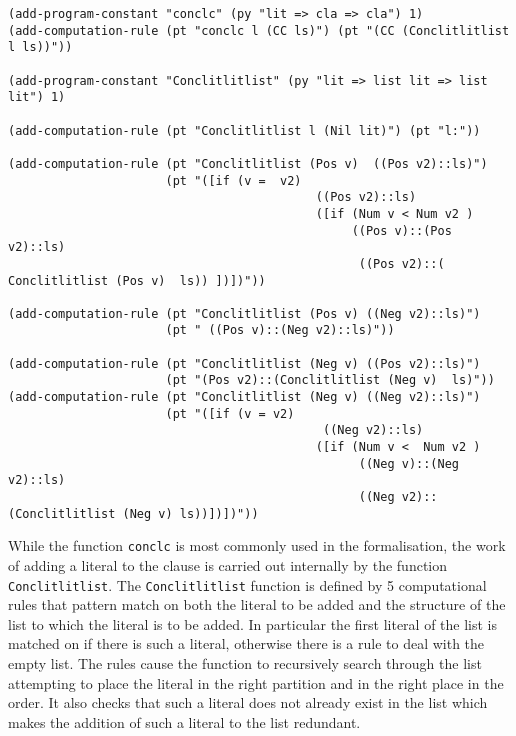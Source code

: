 \begin{lstlisting}[caption =  "Code used to insert a literal into a clause"]
(add-program-constant "conclc" (py "lit => cla => cla") 1)
(add-computation-rule (pt "conclc l (CC ls)") (pt "(CC (Conclitlitlist l ls))"))

(add-program-constant "Conclitlitlist" (py "lit => list lit => list lit") 1)

(add-computation-rule (pt "Conclitlitlist l (Nil lit)") (pt "l:"))

(add-computation-rule (pt "Conclitlitlist (Pos v)  ((Pos v2)::ls)")
                      (pt "([if (v =  v2)                                                                                                       
                                           ((Pos v2)::ls)                                                                                       
                                           ([if (Num v < Num v2 )                                                                               
                                                ((Pos v)::(Pos v2)::ls)                                                                         
                                                 ((Pos v2)::( Conclitlitlist (Pos v)  ls)) ])])"))

(add-computation-rule (pt "Conclitlitlist (Pos v) ((Neg v2)::ls)")
                      (pt " ((Pos v)::(Neg v2)::ls)"))

(add-computation-rule (pt "Conclitlitlist (Neg v) ((Pos v2)::ls)")
                      (pt "(Pos v2)::(Conclitlitlist (Neg v)  ls)"))
(add-computation-rule (pt "Conclitlitlist (Neg v) ((Neg v2)::ls)")
                      (pt "([if (v = v2)                                                                                                        
                                            ((Neg v2)::ls)                                                                                      
                                           ([if (Num v <  Num v2 )                                                                              
                                                 ((Neg v)::(Neg v2)::ls)                                                                        
                                                 ((Neg v2)::(Conclitlitlist (Neg v) ls))])])"))
\end{lstlisting}

While the function \texttt{conclc}  is most commonly used in the formalisation, the work of adding a literal to the clause is carried out internally by the function \texttt{Conclitlitlist}. The \texttt{Conclitlitlist} function is defined by 5 computational rules that pattern match on both the literal to be added and the structure of the list to which the literal is to be added. In particular the first literal of the list is matched on if there is such a literal, otherwise there is a rule to deal with the empty list. The rules cause the function to recursively search through the list attempting to place the literal in the right partition and in the right place in the order. It also checks that such a literal does not already exist in the list which makes the addition of such a literal to the list redundant.

